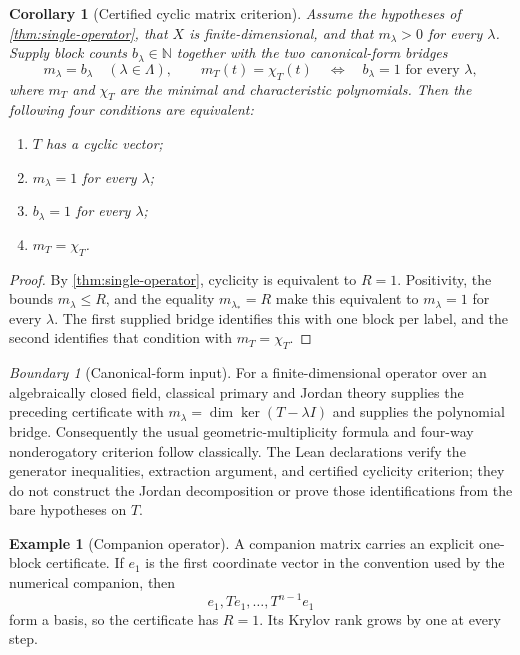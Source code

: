 \documentclass[11pt]{article}
\newtheorem{corollary}[theorem]{Corollary}
\theoremstyle{definition}
\newtheorem{example}[theorem]{Example}
\theoremstyle{remark}
\newtheorem{boundary}[theorem]{Boundary}
\newcommand{\N}{\mathbb N}
\begin{document}
\begin{corollary}[Certified cyclic matrix criterion]
\label{cor:cyclic-matrix-criterion}
Assume the hypotheses of \cref{thm:single-operator}, that $X$ is
finite-dimensional, and that $m_{\lambda}>0$ for every $\lambda$.  Supply
block counts $b_{\lambda}\in\N$ together with the two canonical-form bridges
\[
m_{\lambda}=b_{\lambda}\quad(\lambda\in\Lambda),
\qquad
m_T(t)=\chi_T(t)
\quad\Longleftrightarrow\quad
b_{\lambda}=1\text{ for every }\lambda,
\]
where $m_T$ and $\chi_T$ are the minimal and characteristic polynomials.
Then the following four conditions are equivalent:
\begin{enumerate}[label=(\roman*)]
\item $T$ has a cyclic vector;
\item $m_{\lambda}=1$ for every $\lambda$;
\item $b_{\lambda}=1$ for every $\lambda$;
\item $m_T=\chi_T$.
\end{enumerate}
\end{corollary}

\begin{proof}
By \cref{thm:single-operator}, cyclicity is equivalent to $R=1$.  Positivity,
the bounds $m_{\lambda}\le R$, and the equality
$m_{\lambda_*}=R$ make this equivalent to
$m_{\lambda}=1$ for every $\lambda$.  The first supplied bridge identifies
this with one block per label, and the second identifies that condition with
$m_T=\chi_T$.
\end{proof}

\begin{boundary}[Canonical-form input]
For a finite-dimensional operator over an algebraically closed field,
classical primary and Jordan theory supplies the preceding certificate with
$m_{\lambda}=\dim\ker(T-\lambda I)$ and supplies the polynomial bridge.
Consequently the usual geometric-multiplicity formula and four-way
nonderogatory criterion follow classically.  The Lean declarations verify
the generator inequalities, extraction argument, and certified cyclicity
criterion; they do not construct the Jordan decomposition or prove those
identifications from the bare hypotheses on $T$.
\end{boundary}

\begin{example}[Companion operator]
A companion matrix carries an explicit one-block certificate.  If $e_1$ is
the first coordinate vector in the convention used by the numerical
companion, then
\[
e_1,Te_1,\ldots,T^{n-1}e_1
\]
form a basis, so the certificate has $R=1$.  Its Krylov rank grows by one at
every step.
\end{example}
\end{document}
